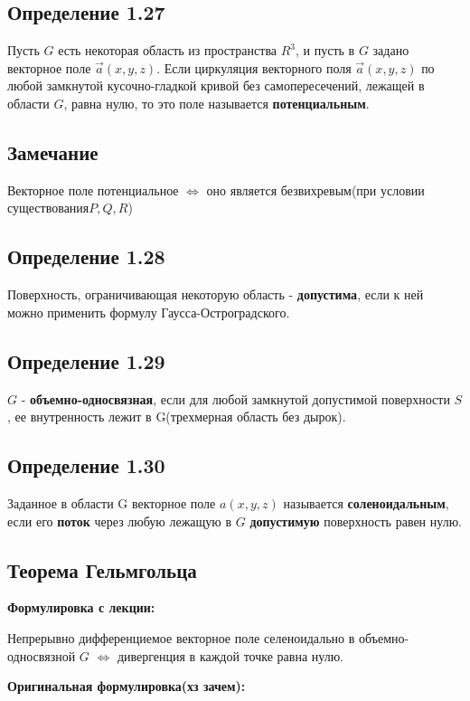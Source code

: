 \documentclass[12pt, english]{article}
\begin{document}
\subsection{Определение 1.27}
Пусть $G$ есть некоторая область из пространства $R^3$, и пусть в $G$ задано
векторное поле $\vec{a}(x, y, z).$
Если циркуляция векторного поля $\vec{a}(x, y, z)$ по любой замкнутой кусочно-гладкой кривой без самопересечений, лежащей в области $G$, равна нулю, то это поле называется \textbf{потенциальным}.

\subsection{Замечание}
	Векторное поле потенциальное $\Leftrightarrow$ оно является безвихревым(при условии существования$ P, Q, R$)
	
	
\subsection{Определение 1.28}	
	Поверхность, ограничивающая некоторую область - \textbf{допустима}, если к ней можно применить формулу Гаусса-Остроградского.
	
\subsection{Определение 1.29}
	$G$ - \textbf{объемно-односвязная}, если для любой замкнутой допустимой поверхности $S$, ее внутренность лежит в G(трехмерная область без дырок).
	
\subsection{Определение 1.30}
Заданное в области G векторное поле $a(x, y, z)$ называется \textbf{соленоидальным}, если его \textbf{поток} через любую лежащую в $G$ \textbf{допустимую} поверхность равен нулю.	
	
\subsection{Теорема	Гельмгольца}
	\par \textbf{Формулировка с лекции:}
	
		Непрерывно дифференциемое векторное поле селеноидально в объемно-односвязной $G$ $\Leftrightarrow$ дивергенция в каждой точке 		равна нулю.
	
	\par \textbf{Оригинальная формулировка(хз зачем):}
	
\end{document}
